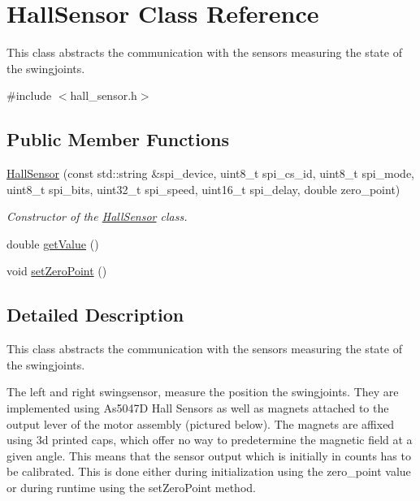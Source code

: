 \hypertarget{classHallSensor}{}\section{Hall\+Sensor Class Reference}
\label{classHallSensor}


This class abstracts the communication with the sensors measuring the state of the swingjoints.  




{\ttfamily \#include $<$hall\+\_\+sensor.\+h$>$}

\subsection*{Public Member Functions}
\begin{DoxyCompactItemize}
\item 
\hyperlink{classHallSensor_ac901b856eff0dffb4dfa5fdeaf888c4c}{Hall\+Sensor} (const std\+::string \&spi\+\_\+device, uint8\+\_\+t spi\+\_\+cs\+\_\+id, uint8\+\_\+t spi\+\_\+mode, uint8\+\_\+t spi\+\_\+bits, uint32\+\_\+t spi\+\_\+speed, uint16\+\_\+t spi\+\_\+delay, double zero\+\_\+point)
\begin{DoxyCompactList}\small\item\em Constructor of the \hyperlink{classHallSensor}{Hall\+Sensor} class. \end{DoxyCompactList}\item 
double \hyperlink{classHallSensor_a5eea1969e798bc786c5fa165aeb47c77}{get\+Value} ()
\item 
void \hyperlink{classHallSensor_ac97079734e670ba56401e6a8b37144e8}{set\+Zero\+Point} ()
\end{DoxyCompactItemize}


\subsection{Detailed Description}
This class abstracts the communication with the sensors measuring the state of the swingjoints. 

The left and right swingsensor, measure the position the swingjoints. They are implemented using As5047D Hall Sensors as well as magnets attached to the output lever of the motor assembly (pictured below).  The magnets are affixed using 3d printed caps, which offer no way to predetermine the magnetic field at a given angle. This means that the sensor output which is initially in counts has to be calibrated. This is done either during initialization using the zero\+\_\+point value or during runtime using the set\+Zero\+Point method.

